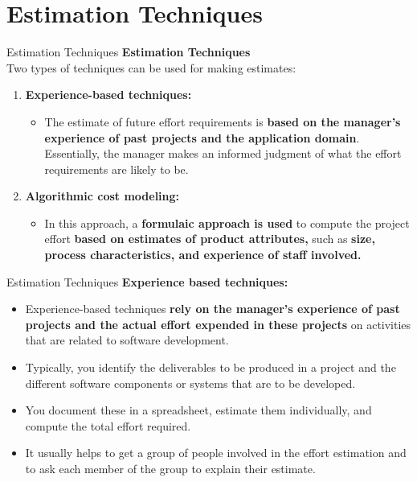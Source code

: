 \documentclass{beamer}
\begin{document}
\section{Estimation Techniques}
\begin{frame}{Estimation Techniques}
\textbf{Estimation Techniques}\\Two types of techniques can be used for making estimates:
\begin{enumerate}
	\item \textbf{Experience-based techniques:}
	\begin{itemize}
		\item The estimate of future effort requirements is\textbf{ based on the manager’s 
			experience of past projects and the application domain}. Essentially, the manager makes an informed 
		judgment of what the effort requirements are likely to be.

	\end{itemize}
	\item \textbf{Algorithmic cost modeling:}
	\begin{itemize}
		\item In this approach, a\textbf{ formulaic approach is used} to compute the project 
		effort \textbf{based on estimates of product attributes,} such as \textbf{size, process characteristics, and experience 
			of staff involved.}
	\end{itemize}
\end{enumerate}
\end{frame}
\begin{frame}{Estimation Techniques}
\textbf{Experience based techniques:}
\begin{itemize}
	\item Experience-based techniques \textbf{rely on the manager’s experience of past projects and the actual effort 
		expended in these projects} on activities that are related to software development.
	\item Typically, you identify the deliverables to be produced in a project and the different software 
	components or systems that are to be developed. 
\item You document these in a spreadsheet, estimate them individually, and compute the total effort 
	required. 
\item It usually helps to get a group of people involved in the effort estimation and to ask each member of 
	the group to explain their estimate.
\end{itemize}
\end{frame}
\end{document}
